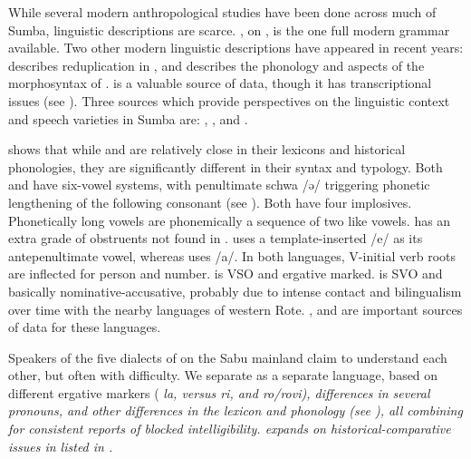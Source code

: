 While several modern anthropological studies have been done across
much of Sumba, linguistic descriptions are scarce.
\citet{Klamer1998a}, on , is the one full modern grammar available.
Two other modern linguistic descriptions have appeared in recent
years: \citet{GhanggoAte2018} describes reduplication in ,
and \citet{Verdizade2019a} describes the phonology
and aspects of the morphosyntax of .
\citet{Onvlee1984} is a valuable source of data,
though it has transcriptional issues (see ).
Three sources which provide perspectives on the linguistic context
and speech varieties in Sumba are: \citet{Asplund2010},
\citet{GhanggoAte2020}, and \citet{Lovestrand2021}.

\citet{Grimes2010a} shows that while 
and  are relatively close in their lexicons
and historical phonologies, they are significantly different
in their syntax and typology.
Both  and  have six-vowel systems,
with penultimate schwa /ə/ triggering phonetic lengthening of
the following consonant (see ).
Both have four implosives.
Phonetically long vowels are phonemically a sequence of two like vowels.
 has an extra grade of obstruents not found in .
 uses a template-inserted /e/ as its antepenultimate vowel,
whereas  uses /a/.
In both languages, V-initial verb roots are inflected for person and number.
 is VSO and ergative marked.
 is SVO and basically nominative-accusative, probably due
to intense contact and bilingualism over time with the nearby languages of western Rote.
\citet{WalkerA1982,Grimes2008,GrimesRanohAplugi2008}, and
\citet{Balukh2020} are important sources of data for these languages.

Speakers of the five dialects of  on the Sabu mainland claim
to understand each other,
but often with difficulty.
We separate  as a separate language,
based on different ergative markers ( \it{la},
versus  \it{ri}, and  \it{ro/rovi}),
differences in several pronouns,
and other differences in the lexicon and phonology (see \citealp{Grimes2010a}),
all combining for consistent reports of blocked intelligibility.
\citet{Blust2012a} expands on historical-comparative issues in
 listed in \citet{Grimes2010a}.